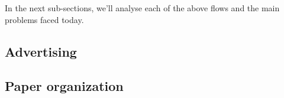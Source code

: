 In the next sub-sections, we'll analyse each of the above flows and the main problems faced today.

\subsection{Advertising}






\subsection{Paper organization}


